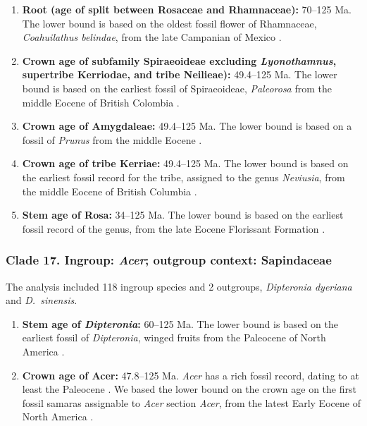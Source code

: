\documentclass[10pt]{article}
\begin{document}
\begin{enumerate}
\item \textbf{Root (age of split between Rosaceae and Rhamnaceae):}
  70--125 Ma. The lower bound is based on the oldest fossil flower
  of Rhamnaceae, \textit{Coahuilathus belindae}, from the late
  Campanian of Mexico \citep{Calvillo-Canadell2007}.

\item \textbf{Crown age of subfamily Spiraeoideae excluding
    \textit{Lyonothamnus}, supertribe Kerriodae, and tribe Neilieae):}
  49.4--125 Ma. The lower bound is based on the earliest fossil of
  Spiraeoideae, \textit{Paleorosa} from the middle Eocene of British
  Colombia \citep{Basinger1976}.

\item \textbf{Crown age of Amygdaleae:} 49.4--125 Ma. The lower
  bound is based on a fossil of \textit{Prunus} from the middle Eocene
  \citep{DeVore2007}.

\item \textbf{Crown age of tribe Kerriae:} 49.4--125 Ma. The lower
  bound is based on the earliest fossil record for the tribe, assigned
  to the genus \textit{Neviusia}, from the middle Eocene of British
  Columbia \citep{DeVore2004}.

\item \textbf{Stem age of Rosa:} 34--125 Ma. The lower bound is
  based on the earliest fossil record of the genus, from the late
  Eocene Florissant Formation \citep{Manchester2001}.
\end{enumerate}

\subsubsection*{Clade 17. Ingroup: \textit{Acer}; outgroup context:
  Sapindaceae}

The analysis included 118 ingroup species and 2 outgroups,
\textit{Dipteronia dyeriana} and \textit{D.~sinensis}.

\begin{enumerate}

\item \textbf{Stem age of \textit{Dipteronia}:} 60--125 Ma. The
  lower bound is based on the earliest fossil of
  \textit{Dipteronia}, winged fruits from the Paleocene of North
  America \citep{McClain2001}.

\item \textbf{Crown age of Acer:} 47.8--125 Ma. \textit{Acer} has a
  rich fossil record, dating to at least the Paleocene
  \citep{Wolfe1987,Mai1995}. We based the lower bound on the crown
  age on the first fossil samaras assignable to \textit{Acer} section
  \textit{Acer}, from the latest Early Eocene of North America
  \citep{Wolfe1987}.

\end{enumerate}
\end{document}
